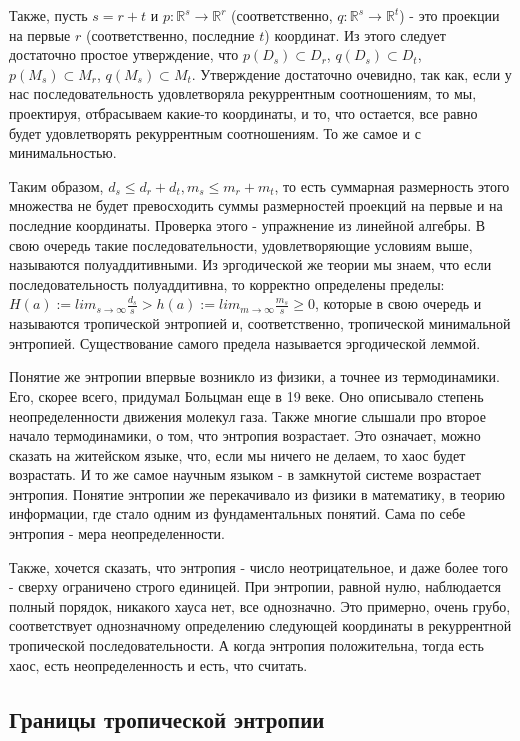 \documentclass[russian]{lecture-notes}
\begin{document}
Также, пусть $s=r+t$ и $p: \mathbb{R}^{s} \rightarrow \mathbb{R}^{r}$ (соответственно, $q: \mathbb{R}^{s} \rightarrow \mathbb{R}^{t}$) - это проекции на первые $r$ (соответственно, последние $t$) координат. Из этого следует достаточно простое утверждение, что $p(D_s) \subset D_r$, $q(D_s) \subset D_t$, $p(M_s) \subset M_r$, $q(M_s) \subset M_t$. Утверждение достаточно очевидно, так как, если у нас последовательность удовлетворяла рекуррентным соотношениям, то мы, проектируя, отбрасываем какие-то координаты, и то, что остается, все равно будет удовлетворять рекуррентным соотношениям. То же самое и с минимальностью.

Таким образом, $d_s \le d_r + d_t, m_s \le m_r + m_t$, то есть суммарная размерность этого множества не будет превосходить суммы размерностей проекций на первые и на последние координаты. Проверка этого - упражнение из линейной алгебры. В свою очередь такие последовательности, удовлетворяющие условиям выше, называются полуаддитивными. Из эргодической же теории мы знаем, что если последовательность полуаддитивна, то корректно определены пределы: $H(a):= lim_{s\to\infty}\frac{d_s}{s} > h(a):= lim_{m\to\infty}\frac{m_s}{s} \ge 0$, которые в свою очередь и называются тропической энтропией и, соответственно, тропической минимальной энтропией. Существование самого предела называется эргодической леммой.

Понятие же энтропии впервые возникло из физики, а точнее из термодинамики. Его, скорее всего, придумал Больцман еще в 19 веке. Оно описывало степень неопределенности движения молекул газа. Также многие слышали про второе начало термодинамики, о том, что энтропия возрастает. Это означает, можно сказать на житейском языке, что, если мы ничего не делаем, то хаос будет возрастать. И то же самое научным языком - в замкнутой системе возрастает энтропия. Понятие энтропии же перекачивало из физики в математику, в теорию информации, где стало одним из фундаментальных понятий. Сама по себе энтропия - мера неопределенности.

Также, хочется сказать, что энтропия - число неотрицательное, и даже более того - сверху ограничено строго единицей. При энтропии, равной нулю, наблюдается полный порядок, никакого хауса нет, все однозначно. Это примерно, очень грубо, соответствует однозначному определению следующей координаты в рекуррентной тропической последовательности. А когда энтропия положительна, тогда есть хаос, есть неопределенность и есть, что считать.
\subsection{Границы тропической энтропии}
\end{document}
